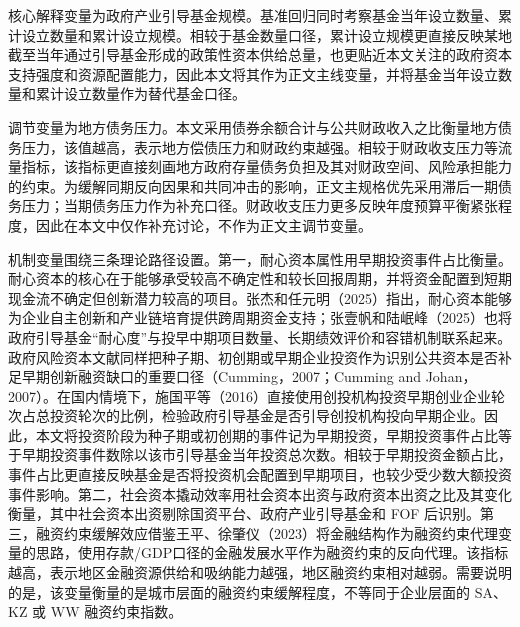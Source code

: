 \documentclass[UTF8,a4paper,zihao=5,fontset=fandol]{ctexart}
\begin{document}
核心解释变量为政府产业引导基金规模。基准回归同时考察基金当年设立数量、累计设立数量和累计设立规模。相较于基金数量口径，累计设立规模更直接反映某地截至当年通过引导基金形成的政策性资本供给总量，也更贴近本文关注的政府资本支持强度和资源配置能力，因此本文将其作为正文主线变量，并将基金当年设立数量和累计设立数量作为替代基金口径。

调节变量为地方债务压力。本文采用债券余额合计与公共财政收入之比衡量地方债务压力，该值越高，表示地方偿债压力和财政约束越强。相较于财政收支压力等流量指标，该指标更直接刻画地方政府存量债务负担及其对财政空间、风险承担能力的约束。为缓解同期反向因果和共同冲击的影响，正文主规格优先采用滞后一期债务压力；当期债务压力作为补充口径。财政收支压力更多反映年度预算平衡紧张程度，因此在本文中仅作补充讨论，不作为正文主调节变量。

机制变量围绕三条理论路径设置。第一，耐心资本属性用早期投资事件占比衡量。耐心资本的核心在于能够承受较高不确定性和较长回报周期，并将资金配置到短期现金流不确定但创新潜力较高的项目。张杰和任元明（2025）指出，耐心资本能够为企业自主创新和产业链培育提供跨周期资金支持；张壹帆和陆岷峰（2025）也将政府引导基金“耐心度”与投早中期项目数量、长期绩效评价和容错机制联系起来。政府风险资本文献同样把种子期、初创期或早期企业投资作为识别公共资本是否补足早期创新融资缺口的重要口径（Cumming，2007；Cumming and Johan，2007）。在国内情境下，施国平等（2016）直接使用创投机构投资早期创业企业轮次占总投资轮次的比例，检验政府引导基金是否引导创投机构投向早期企业。因此，本文将投资阶段为种子期或初创期的事件记为早期投资，早期投资事件占比等于早期投资事件数除以该市引导基金当年投资总次数。相较于早期投资金额占比，事件占比更直接反映基金是否将投资机会配置到早期项目，也较少受少数大额投资事件影响。第二，社会资本撬动效率用社会资本出资与政府资本出资之比及其变化衡量，其中社会资本出资剔除国资平台、政府产业引导基金和 FOF 后识别。第三，融资约束缓解效应借鉴王平、徐肇仪（2023）将金融结构作为融资约束代理变量的思路，使用存款/GDP口径的金融发展水平作为融资约束的反向代理。该指标越高，表示地区金融资源供给和吸纳能力越强，地区融资约束相对越弱。需要说明的是，该变量衡量的是城市层面的融资约束缓解程度，不等同于企业层面的 SA、KZ 或 WW 融资约束指数。
\end{document}
